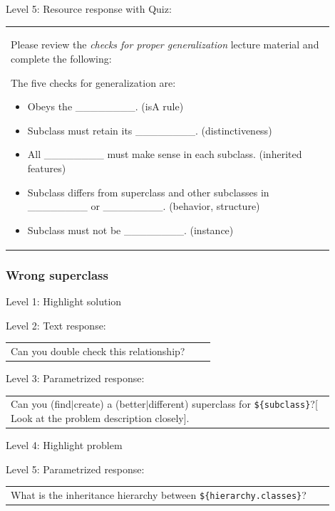 \noindent Level 5: Resource response with Quiz: \medskip

\begin{tabular}{|p{0.9\linewidth}}
Please review the \textit{checks for proper generalization} lecture material
and complete the following:

The five checks for generalization are:
\begin{itemize}
    \item Obeys the \_\_\_\_\_\_\_\_. (isA rule)
    \item Subclass must retain its \_\_\_\_\_\_\_\_. (distinctiveness)
    \item All \_\_\_\_\_\_\_\_ must make sense in each subclass. (inherited features)
    \item Subclass differs from superclass and other subclasses in \_\_\_\_\_\_\_\_ or \_\_\_\_\_\_\_\_. (behavior, structure)
    \item Subclass must not be \_\_\_\_\_\_\_\_. (instance)
\end{itemize}

\end{tabular} \medskip


\subsubsection{Wrong superclass}

\noindent Level 1: Highlight solution \medskip

\noindent Level 2: Text response: \medskip

\begin{tabular}{|p{0.9\linewidth}}
Can you double check this relationship?
\end{tabular} \medskip

\noindent Level 3: Parametrized response: \medskip

\begin{tabular}{|p{0.9\linewidth}}
Can you (find$|$create) a (better$|$different) superclass for \verb|${subclass}|?[ Look at the problem description closely].
\end{tabular} \medskip

\noindent Level 4: Highlight problem \medskip

\noindent Level 5: Parametrized response: \medskip

\begin{tabular}{|p{0.9\linewidth}}
What is the inheritance hierarchy between \verb|${hierarchy.classes}|?
\end{tabular} \medskip

